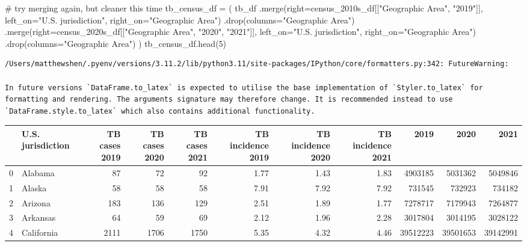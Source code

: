 \documentclass[
  letterpaper,
  DIV=11,
  numbers=noendperiod]{scrreprt}
\newenvironment{Shaded}{\begin{snugshade}}{\end{snugshade}}
\newcommand{\CommentTok}[1]{\textcolor[rgb]{0.37,0.37,0.37}{#1}}
\newcommand{\DecValTok}[1]{\textcolor[rgb]{0.68,0.00,0.00}{#1}}
\newcommand{\NormalTok}[1]{\textcolor[rgb]{0.00,0.23,0.31}{#1}}
\newcommand{\OperatorTok}[1]{\textcolor[rgb]{0.37,0.37,0.37}{#1}}
\newcommand{\StringTok}[1]{\textcolor[rgb]{0.13,0.47,0.30}{#1}}
\begin{document}
\begin{Shaded}
\begin{Highlighting}[]
\CommentTok{\# try merging again, but cleaner this time}
\NormalTok{tb\_census\_df }\OperatorTok{=}\NormalTok{ (}
\NormalTok{    tb\_df}
\NormalTok{    .merge(right}\OperatorTok{=}\NormalTok{census\_2010s\_df[[}\StringTok{"Geographic Area"}\NormalTok{, }\StringTok{"2019"}\NormalTok{]],}
\NormalTok{           left\_on}\OperatorTok{=}\StringTok{"U.S. jurisdiction"}\NormalTok{, right\_on}\OperatorTok{=}\StringTok{"Geographic Area"}\NormalTok{)}
\NormalTok{    .drop(columns}\OperatorTok{=}\StringTok{"Geographic Area"}\NormalTok{)}
\NormalTok{    .merge(right}\OperatorTok{=}\NormalTok{census\_2020s\_df[[}\StringTok{"Geographic Area"}\NormalTok{, }\StringTok{"2020"}\NormalTok{, }\StringTok{"2021"}\NormalTok{]],}
\NormalTok{           left\_on}\OperatorTok{=}\StringTok{"U.S. jurisdiction"}\NormalTok{, right\_on}\OperatorTok{=}\StringTok{"Geographic Area"}\NormalTok{)}
\NormalTok{    .drop(columns}\OperatorTok{=}\StringTok{"Geographic Area"}\NormalTok{)}
\NormalTok{)}
\NormalTok{tb\_census\_df.head(}\DecValTok{5}\NormalTok{)}
\end{Highlighting}
\end{Shaded}

\begin{verbatim}
/Users/matthewshen/.pyenv/versions/3.11.2/lib/python3.11/site-packages/IPython/core/formatters.py:342: FutureWarning:

In future versions `DataFrame.to_latex` is expected to utilise the base implementation of `Styler.to_latex` for formatting and rendering. The arguments signature may therefore change. It is recommended instead to use `DataFrame.style.to_latex` which also contains additional functionality.
\end{verbatim}

\begin{tabular}{llrrrrrrrrr}
\toprule
{} & U.S. jurisdiction &  TB cases 2019 &  TB cases 2020 &  TB cases 2021 &  TB incidence 2019 &  TB incidence 2020 &  TB incidence 2021 &      2019 &      2020 &      2021 \\
\midrule
0 &           Alabama &             87 &             72 &             92 &               1.77 &               1.43 &               1.83 &   4903185 &   5031362 &   5049846 \\
1 &            Alaska &             58 &             58 &             58 &               7.91 &               7.92 &               7.92 &    731545 &    732923 &    734182 \\
2 &           Arizona &            183 &            136 &            129 &               2.51 &               1.89 &               1.77 &   7278717 &   7179943 &   7264877 \\
3 &          Arkansas &             64 &             59 &             69 &               2.12 &               1.96 &               2.28 &   3017804 &   3014195 &   3028122 \\
4 &        California &           2111 &           1706 &           1750 &               5.35 &               4.32 &               4.46 &  39512223 &  39501653 &  39142991 \\
\bottomrule
\end{tabular}
\end{document}
